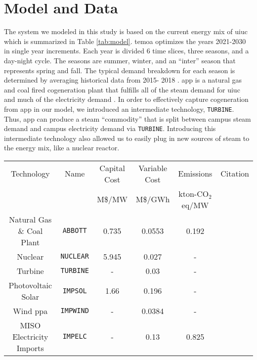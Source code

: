 \section{Model and Data}

The system we modeled in this study is based on the current energy mix of
\gls{uiuc} which is summarized in Table \ref{tab:model}. \gls{temoa} optimizes
the years 2021-2030 in single year increments. Each year is divided 6 time
slices, three seasons, and a day-night cycle. The seasons are summer, winter,
and an ``inter'' season that represents spring and fall. The typical demand
breakdown for each season is determined by averaging historical data from 2015-
2018 \cite{marquissee_uiuc_2019}. \gls{app} is a natural gas and coal fired
cogeneration plant that fulfills all of the steam demand for \gls{uiuc} and
much of the electricity demand \cite{affiliated_engineers_inc_utilities_2015}.
In order to effectively capture cogeneration from \gls{app} in our model, we
introduced an intermediate technology, \texttt{TURBINE}. Thus, \gls{app} can
produce a steam ``commodity'' that is split between campus steam demand and
campus electricity demand via \texttt{TURBINE}. Introducing this intermediate
technology also allowed us to easily plug in new sources of steam to the
energy mix, like a nuclear reactor.
\begin{table*}[ht]
  \centering
  \caption{A summary of the technologies at \gls{uiuc}}
  \label{tab:model}
  \begin{tabular}{|cccccc|}
    \hline
    Technology & Name & Capital Cost & Variable Cost & Emissions& Citation\\
    & & M\$/MW & M\$/GWh & kton-CO$_2$eq/MW&\\
    \hline
    Natural Gas \& Coal Plant & \texttt{ABBOTT} & 0.735 & 0.0553 & 0.192&\cite{isee_illinois_2015,affiliated_engineers_inc_utilities_2015,us_department_of_energy_capital_2016,uiuc_fs_edna_nodate,energy_information_administration_electricity_nodate}\\
    Nuclear & \texttt{NUCLEAR} & 5.945 & 0.027 & - &\cite{us_department_of_energy_capital_2016,desai_nuclear_2018,wna_nuclear_2017,noauthor_eti_2018}\\
    Turbine & \texttt{TURBINE} & - & 0.03  & - &\cite{uiuc_fs_edna_nodate,affiliated_engineers_inc_utilities_2015}\\
    Photovoltaic Solar & \texttt{IMPSOL} & 1.66 & 0.196 & - &\cite{noauthor_solar_nodate,uiuc_fs_edna_nodate}\\
    Wind \gls{ppa} & \texttt{IMPWIND} & - & 0.0384 & - & \cite{breitweiser_wind_2016,uiuc_fs_edna_nodate}\\
    MISO Electricity Imports & \texttt{IMPELC} & - & 0.13 & 0.825&\cite{isee_illinois_2015,uiuc_fs_edna_nodate,noauthor_abbott_nodate}\\
    \hline
  \end{tabular}
\end{table*}

